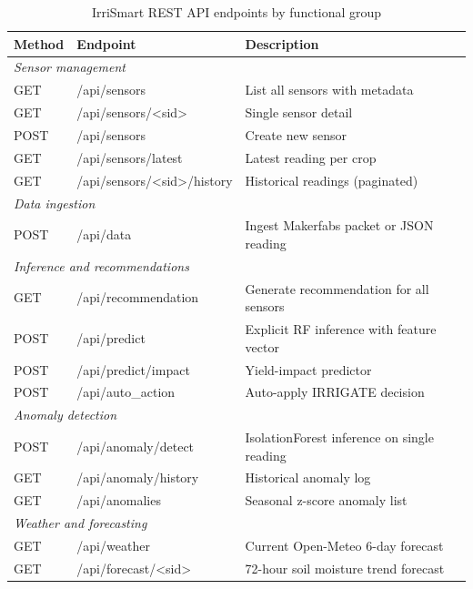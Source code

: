 \documentclass[12pt,a4paper]{report}
\begin{document}
\begin{table}[H]
\centering
\caption{IrriSmart REST API endpoints by functional group}
\label{tab:api}
\begin{tabularx}{\textwidth}{llX}
\toprule
\textbf{Method} & \textbf{Endpoint} & \textbf{Description} \\
\midrule
\multicolumn{3}{l}{\textit{Sensor management}} \\
GET  & /api/sensors                        & List all sensors with metadata \\
GET  & /api/sensors/\textless sid\textgreater          & Single sensor detail \\
POST & /api/sensors                        & Create new sensor \\
GET  & /api/sensors/latest                 & Latest reading per crop \\
GET  & /api/sensors/\textless sid\textgreater/history  & Historical readings (paginated) \\
\midrule
\multicolumn{3}{l}{\textit{Data ingestion}} \\
POST & /api/data                           & Ingest Makerfabs packet or JSON reading \\
\midrule
\multicolumn{3}{l}{\textit{Inference and recommendations}} \\
GET  & /api/recommendation                 & Generate recommendation for all sensors \\
POST & /api/predict                        & Explicit RF inference with feature vector \\
POST & /api/predict/impact                 & Yield-impact predictor \\
POST & /api/auto\_action                   & Auto-apply IRRIGATE decision \\
\midrule
\multicolumn{3}{l}{\textit{Anomaly detection}} \\
POST & /api/anomaly/detect                 & IsolationForest inference on single reading \\
GET  & /api/anomaly/history                & Historical anomaly log \\
GET  & /api/anomalies                      & Seasonal z-score anomaly list \\
\midrule
\multicolumn{3}{l}{\textit{Weather and forecasting}} \\
GET  & /api/weather                        & Current Open-Meteo 6-day forecast \\
GET  & /api/forecast/\textless sid\textgreater         & 72-hour soil moisture trend forecast \\

\end{tabularx}
\end{table}
\end{document}
